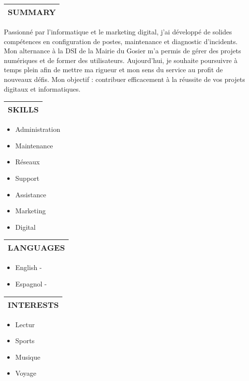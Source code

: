 \documentclass{article}
\makeatletter
\newcommand{\cvsection}[1]{%
  \par\bigskip
  \begin{tabular}{@{}p{\linewidth}}
  \textbf{\Large #1}\\[3pt]\hline
  \end{tabular}\medskip}
\makeatother
\begin{document}
\begin{paracol}{2}
\switchcolumn
\centering
{}


\cvsection{SUMMARY}
Passionné par l’informatique et le marketing digital, j’ai développé de solides compétences en configuration de postes, maintenance et diagnostic d’incidents. Mon alternance à la DSI de la Mairie du Gosier m’a permis de gérer des projets numériques et de former des utilisateurs. Aujourd’hui, je souhaite poursuivre à temps plein afin de mettre ma rigueur et mon sens du service au profit de nouveaux défis. Mon objectif : contribuer efficacement à la réussite de vos projets digitaux et informatiques.

\cvsection{SKILLS}
\begin{itemize}[leftmargin=*]
\item Administration
\item Maintenance
\item Réseaux
\item Support
\item Assistance
\item Marketing
\item Digital\end{itemize}

\cvsection{LANGUAGES}
\begin{itemize}[leftmargin=*]
\item English - \textcolor{gray}{}
\item Espagnol - \textcolor{gray}{}\end{itemize}

\cvsection{INTERESTS}
\begin{itemize}[leftmargin=*]
\item Lectur
\item Sports
\item Musique
\item Voyage
\end{itemize}

\end{paracol}
\end{document}
